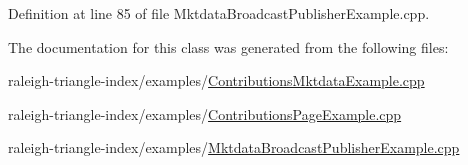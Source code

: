 Definition at line 85 of file Mktdata\+Broadcast\+Publisher\+Example.\+cpp.



The documentation for this class was generated from the following files\+:\begin{DoxyCompactItemize}
\item 
raleigh-\/triangle-\/index/examples/\hyperlink{_contributions_mktdata_example_8cpp}{Contributions\+Mktdata\+Example.\+cpp}\item 
raleigh-\/triangle-\/index/examples/\hyperlink{_contributions_page_example_8cpp}{Contributions\+Page\+Example.\+cpp}\item 
raleigh-\/triangle-\/index/examples/\hyperlink{_mktdata_broadcast_publisher_example_8cpp}{Mktdata\+Broadcast\+Publisher\+Example.\+cpp}\end{DoxyCompactItemize}
